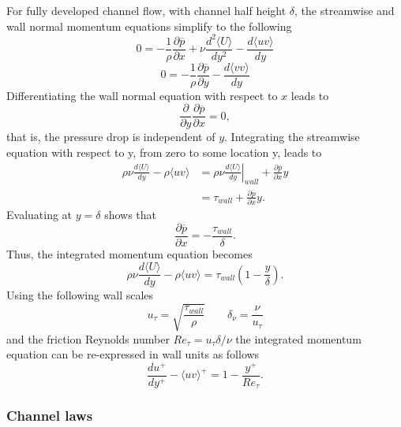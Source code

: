 \documentclass[oneside,a4paper,11pt]{report}
\newcommand{\pavg}{\overline{p}}
\begin{document}
For fully developed channel flow, with channel half height $\delta$, the streamwise and wall normal momentum equations simplify to the following
\begin{equation}
0 = -\frac{1}{\rho}\frac{\partial \pavg}{\partial x} + \nu \frac{d^2 \langle U \rangle}{d y^2} - \frac{d \langle uv \rangle}{d y}
\end{equation}
\begin{equation}
0 = -\frac{1}{\rho}\frac{\partial \pavg}{\partial y} - \frac{d \langle vv \rangle}{d y}
\end{equation}
Differentiating the wall normal equation with respect to $x$ leads to
\begin{equation}
\frac{\partial}{\partial y} \frac{\partial \pavg}{\partial x} = 0,
\end{equation}
that is, the pressure drop is independent of $y$. Integrating the streamwise equation with respect to y, from zero to some location y, leads to
\begin{align}
\rho \nu \frac{d \langle U \rangle}{d y} - \rho\langle uv \rangle &= \left . \rho \nu \frac{d \langle U \rangle}{d y} \right |_{wall} + \frac{\partial \pavg}{\partial x} y \nonumber \\
& = \tau_{wall} + \frac{\partial \pavg}{\partial x} y.
\end{align}
Evaluating at $y = \delta$ shows that
\begin{equation}
\frac{\partial \pavg}{\partial x} = -\frac{\tau_{wall}}{\delta}.
\end{equation}
Thus, the integrated momentum equation becomes
\begin{equation}
\rho \nu \frac{d \langle U \rangle}{d y} - \rho\langle uv \rangle = \tau_{wall} \left ( 1 - \frac{y}{\delta} \right ).
\end{equation}
Using the following wall scales
\begin{equation}
u_\tau = \sqrt{\frac{\tau_{wall}}{\rho}} \qquad \delta_\nu = \frac{\nu}{u_\tau} 
\end{equation}
and the friction Reynolds number $Re_\tau = u_\tau \delta/\nu$ the integrated momentum equation can be re-expressed in wall units as follows
\begin{equation}
\frac{du^+}{dy^+} - \langle uv \rangle^+ = 1 - \frac{y^+}{Re_\tau}.
\end{equation}

\subsubsection{Channel laws}
\end{document}
